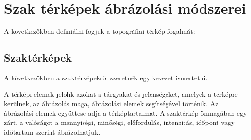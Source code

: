 \makeatletter
\def\thickhrulefill{\leavevmode \leaders \hrule height 1ex \hfill \kern \z@}
\def\@makechapterhead#1{%
  \vspace*{10\p@}%
  {\parindent \z@ \centering \reset@font
        {\Huge \scshape \thechapter}
        \par\nobreak
        \vspace*{15\p@}%
        \interlinepenalty\@M
        \begin{tabular}{@{\qquad}c@{\qquad}}
          \hline
          \\
          {\Huge \bfseries #1\par\nobreak} \\
          \\
          \hline
        \end{tabular}
    \vskip 100\p@
  }}
\def\@makeschapterhead#1{%
  \vspace*{10\p@}%
  {\parindent \z@ \centering \reset@font
        {\Huge \scshape \vphantom{\thechapter}}
        \par\nobreak
        \vspace*{15\p@}%
        \interlinepenalty\@M
        \begin{tabular}{@{\qquad}c@{\qquad}}
          \hline
          \\
          {\Huge \bfseries #1\par\nobreak} \\
          \\
          \hline
        \end{tabular}
    \vskip 100\p@
  }}

\chapter{Szak térképek ábrázolási módszerei}
  A következőkben definiálni fogjuk a topográfiai térkép fogalmát:
	
	\section{Szaktérképek}
	A következőkben a  szaktérképekről szeretnék egy keveset ismertetni.
		
	A térképi elemek jelölik azokat a tárgyakat és jelenségeket, amelyek a térképre kerülnek, az ábrázolás maga,
	ábrázolási elemek segítségével történik. Az ábrázolási elemek együttese adja a térképtartalmat. A szaktérkép
	önmagában egy zárt, a valóságot a mennyiségi, minőségi, előfordulás, intenzitás, időpont vagy időtartam szerint
	ábrázolhatjuk.
		
